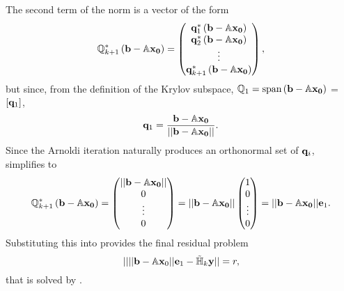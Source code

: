 The second term of the norm is a vector of the form 
\begin{equation}\label{eq:QS}
\mathbb{Q}^*_{k+1}\left ( \mathbf{b}-\mathbb{A}\mathbf{x_0} \right ) = \begin{pmatrix} \mathbf{q}_1^*\left ( \mathbf{b}-\mathbb{A}\mathbf{x_0} \right ) \\ \mathbf{q}_2^*\left ( \mathbf{b}-\mathbb{A}\mathbf{x_0} \right ) \\  \vdots \\ \mathbf{q}_{k+1}^*\left ( \mathbf{b}-\mathbb{A}\mathbf{x_0} \right )  \end{pmatrix},
\end{equation}
but since, from the definition of the Krylov subspace, $\mathbb{Q}_1 = \textrm{span}\left ( \mathbf{b}-\mathbb{A}\mathbf{x_0} \right )$ = $[\mathbf{q}_1]$, 
\begin{equation}
\mathbf{q}_1 = \dfrac{\mathbf{b}-\mathbb{A}\mathbf{x_0}}{||\mathbf{b}-\mathbb{A}\mathbf{x_0}||}.
\end{equation}
Since the Arnoldi iteration naturally produces an orthonormal set of $\mathbf{q}_i$,  simplifies to 
\begin{equation}
 \mathbb{Q}^*_{k+1}\left ( \mathbf{b}-\mathbb{A}\mathbf{x_0} \right ) = \begin{pmatrix} ||\mathbf{b}-\mathbb{A}\mathbf{x_0}|| \\ 0 \\  \vdots \\ 0 \end{pmatrix} =  ||\mathbf{b}-\mathbb{A}\mathbf{x_0}|| \begin{pmatrix}1 \\ 0 \\  \vdots \\ 0 \end{pmatrix} =  ||\mathbf{b}-\mathbb{A}\mathbf{x_0}|| \mathbf{e}_1.
\end{equation}
Substituting this into  provides the final residual problem
\begin{equation}\label{eq:GMRESMIN}
|| {||\mathbf{b} - \mathbb{A}\mathbf{x}_0||}\mathbf{e}_1 - \mathbb{\tilde{H}}_k \mathbf{y} || = r,
\end{equation}
that is solved by .
